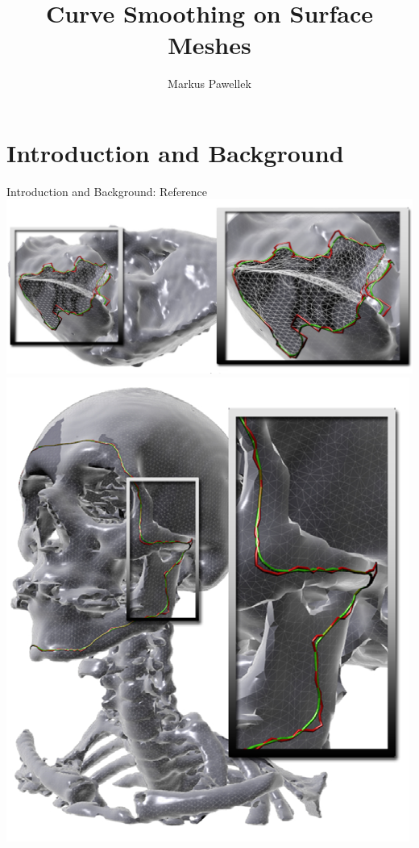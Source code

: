 \documentclass[aspectratio=169,fleqn]{beamer}
\title{Curve Smoothing on Surface Meshes}
\author{Markus Pawellek}
\begin{document}

\frame[plain]{\titlepage}

\setcounter{framenumber}{0}

\section{Introduction and Background}

  \begin{frame}{Introduction and Background: Reference}
    \centering
    \includegraphics[width=0.66\linewidth]{images/lawonn2014-2.png}
    \hfill
    \includegraphics[width=0.24\linewidth]{images/lawonn2014-1.png}

    \bigskip
  \end{frame}
\end{document}
